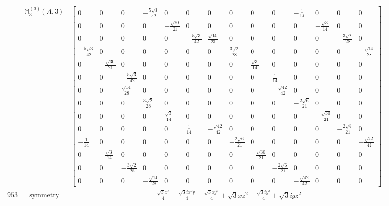 \documentclass[fleqn,8pt,landscape]{jsarticle}
\begin{document}
\begin{longtable}{ccc}
$  $ & $ \mathbb{M}_{3}^{(a)}(A,3) $ & $ \begin{bmatrix} 0 & 0 & 0 & - \frac{5 \sqrt{3}}{42} & 0 & 0 & 0 & 0 & 0 & 0 & - \frac{1}{14} & 0 & 0 & 0 \\ 0 & 0 & 0 & 0 & - \frac{\sqrt{30}}{21} & 0 & 0 & 0 & 0 & 0 & 0 & - \frac{\sqrt{3}}{14} & 0 & 0 \\ 0 & 0 & 0 & 0 & 0 & - \frac{5 \sqrt{3}}{42} & \frac{\sqrt{14}}{28} & 0 & 0 & 0 & 0 & 0 & - \frac{3 \sqrt{2}}{28} & 0 \\ - \frac{5 \sqrt{3}}{42} & 0 & 0 & 0 & 0 & 0 & 0 & \frac{3 \sqrt{2}}{28} & 0 & 0 & 0 & 0 & 0 & - \frac{\sqrt{14}}{28} \\ 0 & - \frac{\sqrt{30}}{21} & 0 & 0 & 0 & 0 & 0 & 0 & \frac{\sqrt{3}}{14} & 0 & 0 & 0 & 0 & 0 \\ 0 & 0 & - \frac{5 \sqrt{3}}{42} & 0 & 0 & 0 & 0 & 0 & 0 & \frac{1}{14} & 0 & 0 & 0 & 0 \\ 0 & 0 & \frac{\sqrt{14}}{28} & 0 & 0 & 0 & 0 & 0 & 0 & - \frac{\sqrt{42}}{42} & 0 & 0 & 0 & 0 \\ 0 & 0 & 0 & \frac{3 \sqrt{2}}{28} & 0 & 0 & 0 & 0 & 0 & 0 & - \frac{2 \sqrt{6}}{21} & 0 & 0 & 0 \\ 0 & 0 & 0 & 0 & \frac{\sqrt{3}}{14} & 0 & 0 & 0 & 0 & 0 & 0 & - \frac{\sqrt{30}}{21} & 0 & 0 \\ 0 & 0 & 0 & 0 & 0 & \frac{1}{14} & - \frac{\sqrt{42}}{42} & 0 & 0 & 0 & 0 & 0 & - \frac{2 \sqrt{6}}{21} & 0 \\ - \frac{1}{14} & 0 & 0 & 0 & 0 & 0 & 0 & - \frac{2 \sqrt{6}}{21} & 0 & 0 & 0 & 0 & 0 & - \frac{\sqrt{42}}{42} \\ 0 & - \frac{\sqrt{3}}{14} & 0 & 0 & 0 & 0 & 0 & 0 & - \frac{\sqrt{30}}{21} & 0 & 0 & 0 & 0 & 0 \\ 0 & 0 & - \frac{3 \sqrt{2}}{28} & 0 & 0 & 0 & 0 & 0 & 0 & - \frac{2 \sqrt{6}}{21} & 0 & 0 & 0 & 0 \\ 0 & 0 & 0 & - \frac{\sqrt{14}}{28} & 0 & 0 & 0 & 0 & 0 & 0 & - \frac{\sqrt{42}}{42} & 0 & 0 & 0 \end{bmatrix} $ \\ \hline
$ 953 $ & $ \text{symmetry} $ & $ - \frac{\sqrt{3} x^{3}}{4} - \frac{\sqrt{3} i x^{2} y}{4} - \frac{\sqrt{3} x y^{2}}{4} + \sqrt{3} x z^{2} - \frac{\sqrt{3} i y^{3}}{4} + \sqrt{3} i y z^{2} $ \\

\end{longtable}
\end{document}
